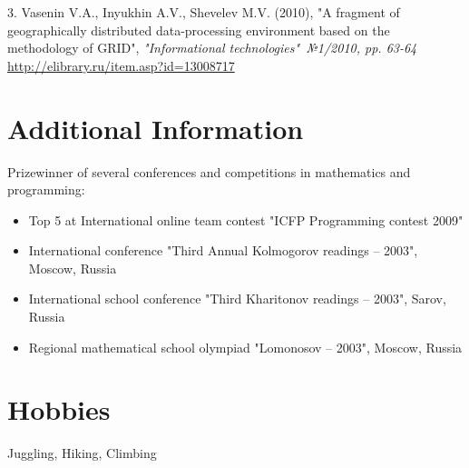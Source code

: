 \documentclass[unicode,a4paper,10pt]{article}
\begin{document}
3. Vasenin V.A., Inyukhin A.V., Shevelev M.V. (2010), "A fragment of geographically distributed data-processing environment based on the methodology of GRID", 
\textit{"Informational technologies"\ №1/2010, pp. 63-64}\\
\href{http://elibrary.ru/item.asp?id=13008717}{http://elibrary.ru/item.asp?id=13008717}

\section{Additional Information}
Prizewinner of several conferences and competitions in mathematics and programming:
\begin{itemize}
\item Top 5 at International online team contest "ICFP Programming contest 2009"
\item International conference "Third Annual Kolmogorov readings -- 2003", Moscow, Russia
\item International school conference "Third Kharitonov readings -- 2003", Sarov, Russia
\item Regional mathematical school olympiad "Lomonosov -- 2003", Moscow, Russia
\end{itemize}

\section{Hobbies}
Juggling, Hiking, Climbing



\end{document}
